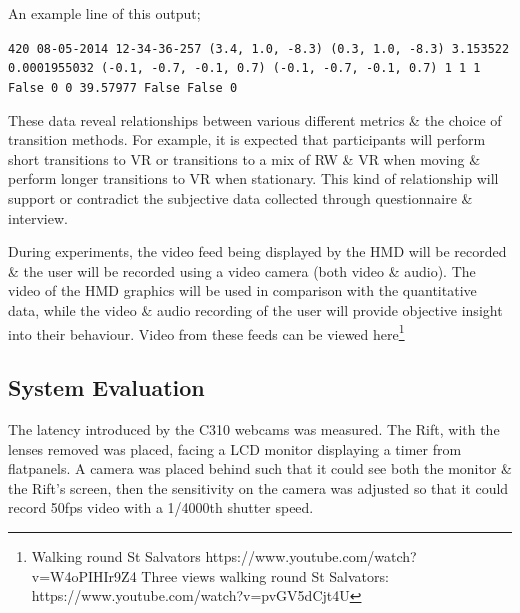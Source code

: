 \documentclass[conference]{acmsiggraph}
\begin{document}

An example line of this output;

\begin{center}
	\texttt{420	08-05-2014 12-34-36-257	(3.4, 1.0, -8.3)	(0.3, 1.0, -8.3)	3.153522	0.0001955032	(-0.1, -0.7, -0.1, 0.7)	(-0.1, -0.7, -0.1, 0.7)	1	1	1	False	0	0	39.57977	False	False	0}
\end{center}

These data reveal relationships between various different metrics \& the choice of transition methods. For example, it is expected that participants will perform short transitions to VR or transitions to a mix of RW \& VR when moving \& perform longer transitions to VR when stationary. This kind of relationship will support or contradict the subjective data collected through questionnaire \& interview.

During experiments, the video feed being displayed by the HMD will be recorded \& the user will be recorded using a video camera (both video \& audio). The video of the HMD graphics will be used in comparison with the quantitative data, while the video \& audio recording of the user will provide objective insight into their behaviour. Video from these feeds can be viewed here\footnote{Walking round St Salvators https://www.youtube.com/watch?v=W4oPIHIr9Z4
Three views walking round St Salvators: https://www.youtube.com/watch?v=pvGV5dCjt4U}


\subsection{System Evaluation}
The latency introduced by the C310 webcams was measured. The Rift, with the lenses removed was placed, facing a LCD monitor displaying a timer from flatpanels. A camera was placed behind such that it could see both the monitor \& the Rift’s screen, then the sensitivity on the camera was adjusted so that it could record 50fps video with a 1/4000th shutter speed.
\end{document}

